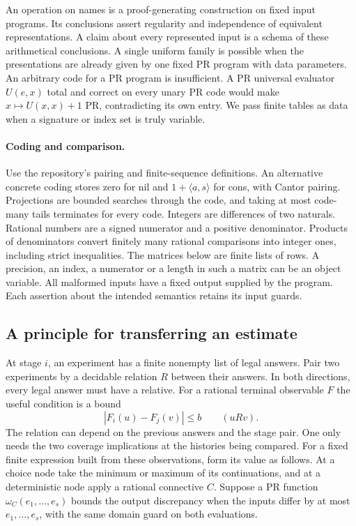 An operation on names is a proof-generating construction on fixed input programs. Its conclusions assert regularity and independence of equivalent representations. A claim about every represented input is a schema of these arithmetical conclusions. A single uniform family is possible when the presentations are already given by one fixed PR program with data parameters. An arbitrary code for a PR program is insufficient. A PR universal evaluator \(U(e,x)\) total and correct on every unary PR code would make \(x\mapsto U(x,x)+1\) PR, contradicting its own entry. We pass finite tables as data when a signature or index set is truly variable.

\paragraph{Coding and comparison.}
Use the repository's pairing and finite-sequence definitions. An alternative concrete coding stores zero for nil and \(1+\langle a,s\rangle\) for cons, with Cantor pairing. Projections are bounded searches through the code, and taking at most code-many tails terminates for every code. Integers are differences of two naturals. Rational numbers are a signed numerator and a positive denominator. Products of denominators convert finitely many rational comparisons into integer ones, including strict inequalities. The matrices below are finite lists of rows. A precision, an index, a numerator or a length in such a matrix can be an object variable. All malformed inputs have a fixed output supplied by the program. Each assertion about the intended semantics retains its input guards.

\subsection{A principle for transferring an estimate}
\label{sec:principle}
At stage \(i\), an experiment has a finite nonempty list of legal answers. Pair two experiments by a decidable relation \(R\) between their answers. In both directions, every legal answer must have a relative. For a rational terminal observable \(F\) the useful condition is a bound
\[
 |F_i(u)-F_j(v)|\le b\qquad(uRv).
\]
The relation can depend on the previous answers and the stage pair. One only needs the two coverage implications at the histories being compared. For a fixed finite expression built from these observations, form its value as follows. At a choice node take the minimum or maximum of its continuations, and at a deterministic node apply a rational connective \(C\). Suppose a PR function \(\omega_C(e_1,\ldots,e_s)\) bounds the output discrepancy when the inputs differ by at most \(e_1,\ldots,e_s\), with the same domain guard on both evaluations.

